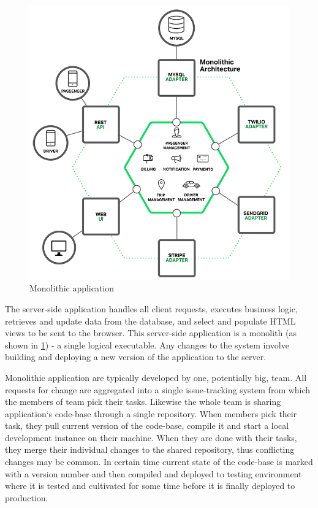 \documentclass[12pt,oneside]{fithesis2}
\begin{document}
\begin{figure}[ht!]
	\centering
	\includegraphics[width=\textwidth]{images/monolithic_application2.png}
	\caption{Monolithic application\footnotemark}
	\label{monolithic_application}
\end{figure}


The server-side application handles all client requests, executes business logic, retrieves and update data from the database, and select and populate HTML views to be sent to the browser. This server-side application is a monolith (as shown in \ref{monolithic_application}) - a single logical executable. Any changes to the system involve building and deploying a new version of the application to the server. \cite{mf}

Monolithic application are typically developed by one, potentially big, team. All requests for change are aggregated into a single issue-tracking system from which the members of team pick their tasks. Likewise the whole team is sharing application`s code-base through a single repository. When members pick their task, they pull current version of the code-base, compile it and start a local development instance on their machine. When they are done with their tasks, they merge their individual changes to the shared repository, thus conflicting changes may be common. In certain time current state of the code-base is marked with a version number and then compiled and deployed to testing environment where it is tested and cultivated for some time before it is finally deployed to production.
\end{document}
